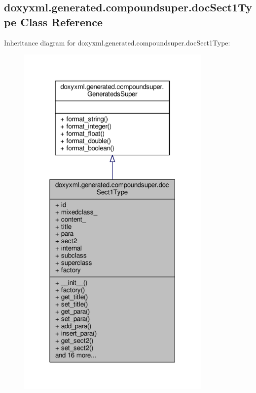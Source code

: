 \subsection{doxyxml.\+generated.\+compoundsuper.\+doc\+Sect1\+Type Class Reference}
\label{classdoxyxml_1_1generated_1_1compoundsuper_1_1docSect1Type}


Inheritance diagram for doxyxml.\+generated.\+compoundsuper.\+doc\+Sect1\+Type\+:
\nopagebreak
\begin{figure}[H]
\begin{center}
\leavevmode
\includegraphics[width=270pt]{df/d0b/classdoxyxml_1_1generated_1_1compoundsuper_1_1docSect1Type__inherit__graph}
\end{center}
\end{figure}


